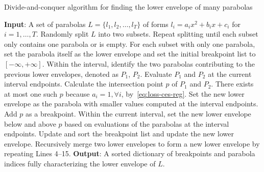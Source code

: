 
\begin{algorithm}[H]
    \caption{Divide-and-conquer algorithm for finding the lower envelope of many parabolas}
    \label{alg:envelope}
    \begin{algorithmic} [1]
        \STATE \textbf{Input}: A set of parabolas $L = \{l_1, l_2, \dots, l_T \}$ of forms $l_i = a_i x^2 + b_i x + c_i$ for $i=1,\dots, T$.
        \STATE Randomly split $L$ into two subsets. Repeat splitting until each subset only contains one parabola or is empty.
        \STATE For each subset with only one parabola, set the parabola itself as the lower envelope and set the initial breakpoint list to $[-\infty, +\infty]$.
            \STATE Within the interval, identify the two parabolas contributing to the previous lower envelopes, denoted as $P_1$, $P_2$.
            \STATE Evaluate $P_1$ and $P_2$ at the current interval endpoints.
            \STATE Calculate the intersection point $p$ of $P_1$ and $P_2$. There exists at most one such $p$ because $a_i = 1, \forall i$, by~\eqref{eq:loss-ces-reg}.
            \STATE Set the new lower envelope as the parabola with smaller values computed at the interval endpoints.
            \ELSE \STATE Add $p$ as a breakpoint.
            \STATE Within the current interval, set the new lower envelope below and above $p$ based on evaluations of the parabolas at the interval endpoints.
            \ENDIF
            \STATE Update and sort the breakpoint list and update the new lower envelope.
        \ENDFOR
        \STATE Recursively merge two lower envelopes to form a new lower envelope by repeating Lines 4--15.
        \STATE \textbf{Output}: A sorted dictionary of breakpoints and parabola indices fully characterizing the lower envelope of $L$.
\end{algorithmic}
\end{algorithm}


